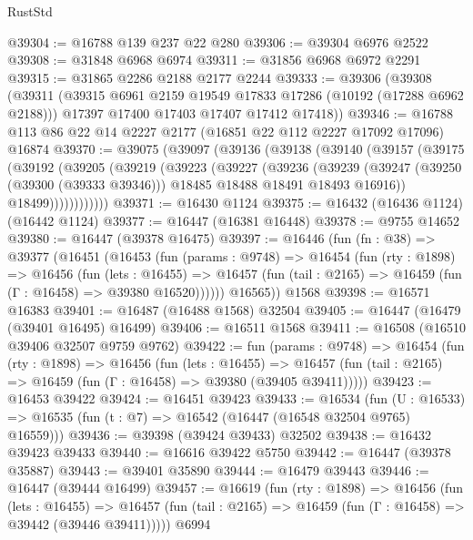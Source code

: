 \begin{lexlean}{RustStd}
\begin{coremodule}
@39304 := @16788 @139 @237 @22 @280
@39306 := @39304 @6976 @2522
@39308 := @31848 @6968 @6974
@39311 := @31856 @6968 @6972 @2291
@39315 := @31865 @2286 @2188 @2177 @2244
@39333 := @39306
    (@39308
      (@39311
        (@39315 @6961 @2159 @19549 @17833 @17286 (@10192 (@17288 @6962 @2188)))
        @17397
        @17400
        @17403
        @17407
        @17412
        @17418))
@39346 := @16788 @113 @86 @22 @14 @2227 @2177 (@16851 @22 @112 @2227 @17092 @17096) @16874
@39370 := @39075
    (@39097
      (@39136
        (@39138
          (@39140
            (@39157
              (@39175
                (@39192
                  (@39205
                    (@39219
                      (@39223
                        (@39227
                          (@39236
                            (@39239
                              (@39247
                                (@39250 (@39300 (@39333 @39346)))
                                @18485
                                @18488
                                @18491
                                @18493
                                @16916))
                            @18499))))))))))))
@39371 := @16430 @1124
@39375 := @16432 (@16436 @1124) (@16442 @1124)
@39377 := @16447 (@16381 @16448)
@39378 := @9755 @14652
@39380 := @16447 (@39378 @16475)
@39397 := @16446
    (fun (fn : @38) =>
    @39377
      (@16451
        (@16453
          (fun (params : @9748) =>
          @16454
            (fun (rty : @1898) =>
            @16456
              (fun (lets : @16455) =>
              @16457 (fun (tail : @2165) => @16459 (fun (Γ : @16458) => @39380 @16520))))))
        @16565))
    @1568
@39398 := @16571 @16383
@39401 := @16487 (@16488 @1568) @32504
@39405 := @16447 (@16479 (@39401 @16495) @16499)
@39406 := @16511 @1568
@39411 := @16508 (@16510 @39406 @32507 @9759 @9762)
@39422 := fun (params : @9748) =>
  @16454
    (fun (rty : @1898) =>
    @16456
      (fun (lets : @16455) =>
      @16457 (fun (tail : @2165) => @16459 (fun (Γ : @16458) => @39380 (@39405 @39411)))))
@39423 := @16453 @39422
@39424 := @16451 @39423
@39433 := @16534
    (fun (U : @16533) => @16535 (fun (t : @7) => @16542 (@16447 (@16548 @32504 @9765) @16559)))
@39436 := @39398 (@39424 @39433) @32502
@39438 := @16432 @39423 @39433
@39440 := @16616 @39422 @5750
@39442 := @16447 (@39378 @35887)
@39443 := @39401 @35890
@39444 := @16479 @39443
@39446 := @16447 (@39444 @16499)
@39457 := @16619
    (fun (rty : @1898) =>
    @16456
      (fun (lets : @16455) =>
      @16457 (fun (tail : @2165) => @16459 (fun (Γ : @16458) => @39442 (@39446 @39411)))))
    @6994

\end{coremodule}
\end{lexlean}
